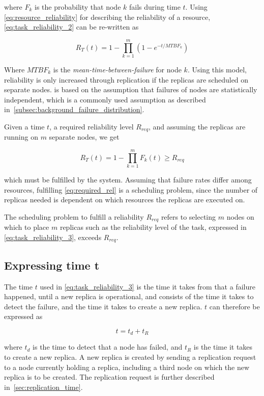 \documentclass{cslthse-msc}
\begin{document}
where $F_k$ is the probability that node $k$ fails during time $t$. Using \cref{eq:resource_reliability} for describing the reliability of a resource, \cref{eq:task_reliability_2} can be re-written as

\begin{equation} \label{eq:task_reliability_3}
R_{T}(t) = 1 - \prod\limits_{k=1}^m (1 - e^{-t/MTBF_k})
\end{equation}

Where $MTBF_k$ is the \emph{mean-time-between-failure} for node $k$. Using this model, reliability is only increased through replication if the replicas are scheduled on separate nodes.  is based on the assumption that failures of nodes are statistically independent, which is a commonly used assumption as described in~\cref{subsec:background_failure_distribution}.

Given a time $t$, a required reliability level $R_{req}$, and assuming the replicas are running on $m$ separate nodes, we get

\begin{equation} \label{eq:required_rel}
R_T(t) = 1 - \prod\limits_{k=1}^m F_{k}(t) \geq R_{req}
\end{equation}

which must be fulfilled by the system. Assuming that failure rates differ among resources, fulfilling \cref{eq:required_rel} is a scheduling problem, since the number of replicas needed is dependent on which resources the replicas are executed on.

The scheduling problem to fulfill a reliability $R_{req}$ refers to selecting $m$ nodes on which to place $m$ replicas such as the reliability level of the task, expressed in \cref{eq:task_reliability_3}, exceeds $R_{req}$.

\subsection{Expressing time t} \label{sec:design_time_t}
The time $t$ used in \cref{eq:task_reliability_3} is the time it takes from that a failure happened, until a new replica is operational, and consists of the time it takes to detect the failure, and the time it takes to create a new replica. $t$ can therefore be expressed as 

\begin{equation} \label{eq:rep_time}
	t = t_d + t_R
\end{equation}

where $t_d$ is the time to detect that a node has failed, and $t_R$ is the time it takes to create a new replica. A new replica is created by sending a replication request to a node currently holding a replica, including a third node on which the new replica is to be created. The replication request is further described in~\cref{sec:replication_time}.
\end{document}
